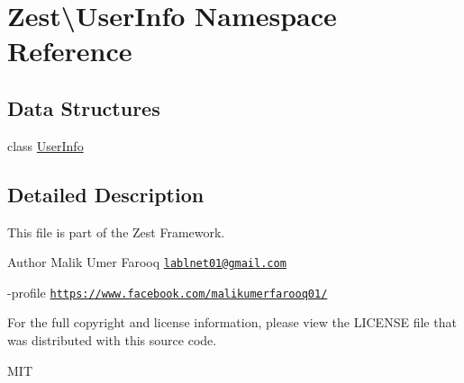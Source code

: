 \hypertarget{namespace_zest_1_1_user_info}{}\section{Zest\textbackslash{}User\+Info Namespace Reference}
\label{namespace_zest_1_1_user_info}
\subsection*{Data Structures}
\begin{DoxyCompactItemize}
\item 
class \mbox{\hyperlink{class_zest_1_1_user_info_1_1_user_info}{User\+Info}}
\end{DoxyCompactItemize}


\subsection{Detailed Description}
This file is part of the Zest Framework.

\begin{DoxyAuthor}{Author}
Malik Umer Farooq \href{mailto:lablnet01@gmail.com}{\tt lablnet01@gmail.\+com} 

-\/profile \href{https://www.facebook.com/malikumerfarooq01/}{\tt https\+://www.\+facebook.\+com/malikumerfarooq01/}
\end{DoxyAuthor}
For the full copyright and license information, please view the L\+I\+C\+E\+N\+SE file that was distributed with this source code.

M\+IT 